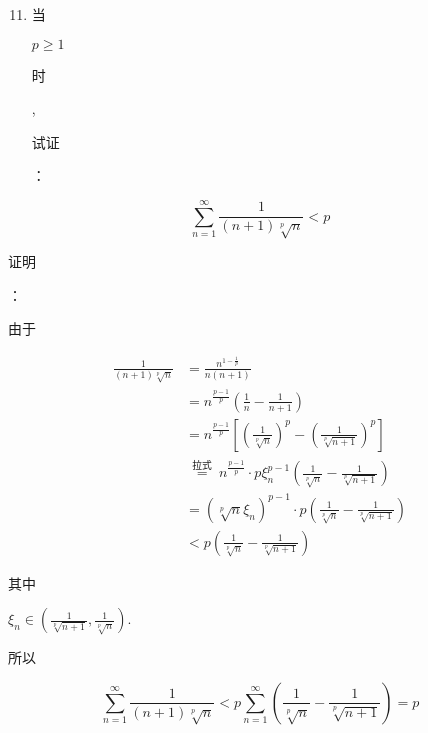 \documentclass[10pt]{article}
\begin{document}
\begin{enumerate}
  \setcounter{enumi}{10}
  \item \begin{CJK}{UTF8}{mj}当\end{CJK} $p \geq 1$ \begin{CJK}{UTF8}{mj}时\end{CJK}, \begin{CJK}{UTF8}{mj}试证\end{CJK}：
\end{enumerate}
$$
\sum_{n=1}^{\infty} \frac{1}{(n+1) \sqrt[p]{n}}<p
$$
\begin{CJK}{UTF8}{mj}证明\end{CJK}：\begin{CJK}{UTF8}{mj}由于\end{CJK}
$$
\begin{aligned}
\frac{1}{(n+1) \sqrt[p]{n}} &=\frac{n^{1-\frac{1}{p}}}{n(n+1)} \\
&=n^{\frac{p-1}{p}}\left(\frac{1}{n}-\frac{1}{n+1}\right) \\
&=n^{\frac{p-1}{p}}\left[\left(\frac{1}{\sqrt[p]{n}}\right)^{p}-\left(\frac{1}{\sqrt[p]{n+1}}\right)^{p}\right] \\
& \stackrel{\text { 拉式 }}{=} n^{\frac{p-1}{p}} \cdot p \xi_{n}^{p-1}\left(\frac{1}{\sqrt[p]{n}}-\frac{1}{\sqrt[p]{n+1}}\right) \\
&=\left(\sqrt[p]{n} \xi_{n}\right)^{p-1} \cdot p\left(\frac{1}{\sqrt[p]{n}}-\frac{1}{\sqrt[p]{n+1}}\right) \\
&<p\left(\frac{1}{\sqrt[p]{n}}-\frac{1}{\sqrt[p]{n+1}}\right)
\end{aligned}
$$
\begin{CJK}{UTF8}{mj}其中\end{CJK} $\xi_{n} \in\left(\frac{1}{\sqrt[p]{n+1}}, \frac{1}{\sqrt[p]{n}}\right)$.

\begin{CJK}{UTF8}{mj}所以\end{CJK}
$$
\sum_{n=1}^{\infty} \frac{1}{(n+1) \sqrt[p]{n}}<p \sum_{n=1}^{\infty}\left(\frac{1}{\sqrt[p]{n}}-\frac{1}{\sqrt[p]{n+1}}\right)=p
$$
\end{document}
